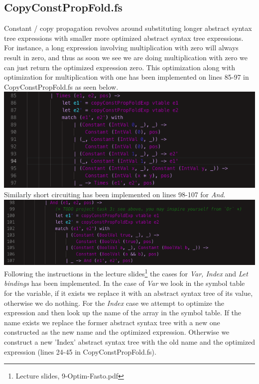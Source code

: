 \subsection{CopyConstPropFold.fs}
Constant / copy propagation revolves around substituting longer abstract syntax tree  expressions with smaller more optimized abstract syntax tree expressions. For instance, a long expression involving multiplication with zero will always result in zero, and thus as soon we see we are doing multiplication with zero we can just return the optimized expression zero. This optimization along with optimization for multiplication with one has been implemented on lines 85-97 in CopyConstPropFold.fs as seen below.\\
\includegraphics[width=\linewidth]{Materials/Optimization/Times}\\
Similarly short circuiting has been implemented on lines 98-107 for \textit{And}.\\
\includegraphics[width=\linewidth]{Materials/Optimization/And}\\
Following the instructions in the lecture slides\footnote{Lecture slides, 9-Optim-Fasto.pdf} the cases for \textit{Var, Index} and \textit{Let bindings} has been implemented. In the case of \textit{Var} we look in the symbol table for the variable, if it exists we replace it with an abstract syntax tree of its value, otherwise we do nothing. For the \textit{Index} case we attempt to optimize the expression and then look up the name of the array in the symbol table. If the name exists we replace the former abstract syntax tree with a new one constructed as the new name and the optimized expression. Otherwise we construct a new 'Index' abstract syntax tree with the old name and the optimized expression (lines 24-45 in CopyConstPropFold.fs).\\
